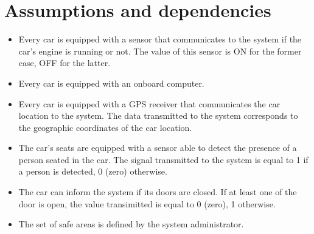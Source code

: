 \section{Assumptions and dependencies}

\begin{itemize}
	\item Every car is equipped with a sensor that communicates to the system if the car's engine is running or not. The value of this sensor is ON for the former case, OFF for the latter.
	\item Every car is equipped with an onboard computer.
	\item Every car is equipped with a GPS receiver that communicates the car location to the system. The data transmitted to the system corresponds to the geographic coordinates of the car location.
	\item The car's seats are equipped with a sensor able to detect the presence of a person seated in the car. The signal transmitted to the system is equal to 1 if a person is detected, 0 (zero) otherwise.
	\item The car can inform the system if its doors are closed. If at least one of the door is open, the value transimitted is equal to 0 (zero), 1 otherwise.
	\item The set of safe areas is defined by the system administrator.
\end{itemize}
